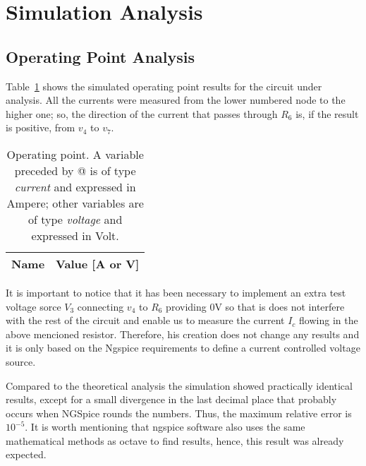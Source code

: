 \section{Simulation Analysis }
\label{sec:simulation}

\subsection{Operating Point Analysis}

Table~\ref{tab:op} shows the simulated operating point results for the circuit under analysis. All the currents were measured from the lower numbered node to the higher one; so, the direction of the current that passes through $R_6$ is, if the result is positive, from $v_4$ to $v_7$.

\begin{table}[h]
  \centering
  \begin{tabular}{|l|r|}
    \hline    
    {\bf Name} & {\bf Value [A or V]} \\ \hline
    
  \end{tabular}
  \caption{Operating point. A variable preceded by @ is of type {\em current}
    and expressed in Ampere; other variables are of type {\it voltage} and expressed in
    Volt.}
  \label{tab:op}
\end{table}

It is important to notice that it has been necessary to implement an extra test voltage sorce $V_3$ connecting $v_4$ to $R_6$ providing 0V so that is does not interfere with the rest of the circuit and enable us to measure the current $I_c$ flowing in the above mencioned resistor. Therefore, his creation does not change any results and it is only based on the Ngspice requirements to define a current controlled voltage source.

Compared to the theoretical analysis the simulation showed practically identical results, except for a small divergence in the last decimal place that probably occurs when NGSpice rounds the numbers. Thus, the maximum relative error is $10^{-5}$.
It is worth mentioning that ngspice software also uses the same mathematical methods as octave to find results, hence, this result was already expected.









